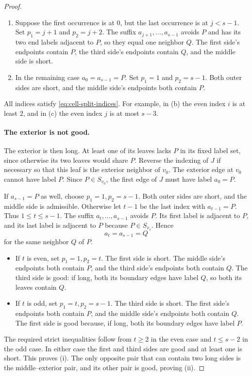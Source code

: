\documentclass[11pt]{article}
\theoremstyle{definition}
\theoremstyle{remark}
\numberwithin{equation}{section}
\begin{document}
\begin{proof}
\begin{enumerate}[label=\textup{(\alph*)}]
 \item Suppose the first occurrence is at $0$, but the last occurrence
 is at $j<s-1$.  Set $p_1=j+1$ and $p_2=j+2$.
 The suffix $a_{j+1},\ldots,a_{s-1}$ avoids $P$ and has its two end
 labels adjacent to $P$, so they equal one neighbor $Q$.
 The first side's endpoints contain $P$, the third side's endpoints
 contain $Q$, and the middle side is short.

 \item In the remaining case $a_0=a_{s-1}=P$.
 Set $p_1=1$ and $p_2=s-1$.  Both outer sides are short, and the
 middle side's endpoints both contain $P$.
\end{enumerate}
All indices satisfy \eqref{eq:cell-split-indices}.  For example, in
\textup{(b)} the even index $i$ is at least $2$, and in \textup{(c)}
the even index $j$ is at most $s-3$.

\paragraph{The exterior is not good.}
The exterior is then long.  At least one of its leaves lacks $P$ in
its fixed label set, since otherwise its two leaves would share $P$.
Reverse the indexing of $J$ if necessary so that this leaf is the
exterior neighbor of $v_0$.  The exterior edge at $v_0$ cannot have
label $P$.  Since $P\in S_{v_0}$, the first edge of $J$ must have
label $a_0=P$.

If $a_{s-1}=P$ as well, choose $p_1=1,p_2=s-1$.  Both outer sides
are short, and the middle side is admissible.  Otherwise let $t-1$
be the last index with $a_{t-1}=P$.  Thus $1\le t\le s-1$.
The suffix $a_t,\ldots,a_{s-1}$ avoids $P$.  Its first label is
adjacent to $P$, and its last label is adjacent to $P$ because
$P\in S_{v_s}$.  Hence
\[
 a_t=a_{s-1}=Q
\]
for the same neighbor $Q$ of $P$.
\begin{itemize}
 \item If $t$ is even, set $p_1=1,p_2=t$.
 The first side is short.  The middle side's endpoints both contain
 $P$, and the third side's endpoints both contain $Q$.
 The third side is good: if long, both its boundary edges have
 label $Q$, so both its leaves contain $Q$.

 \item If $t$ is odd, set $p_1=t,p_2=s-1$.
 The third side is short.  The first side's endpoints both contain
 $P$, and the middle side's endpoints both contain $Q$.
 The first side is good because, if long, both its boundary edges
 have label $P$.
\end{itemize}
The required strict inequalities follow from $t\ge2$ in the even
case and $t\le s-2$ in the odd case.  In either case the first and
third sides are good and at least one is short.  This proves
\textup{(i)}.  The only opposite pair that can contain two long sides
is the middle--exterior pair, and its other pair is good, proving
\textup{(ii)}.


\end{proof}
\end{document}
